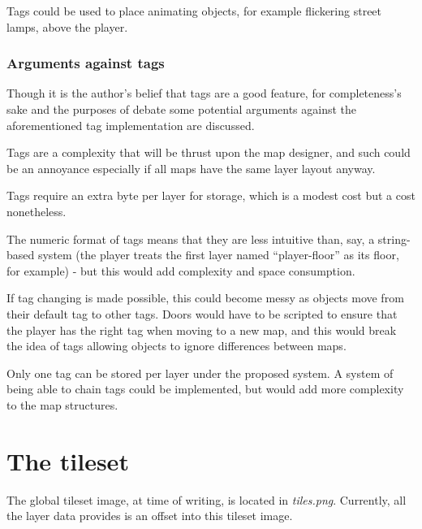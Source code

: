 \documentclass [12pt,a4paper]{article}
\begin{document}
Tags could be used to place animating objects, for example flickering
street lamps, above the player.

\subsubsection{Arguments against tags}

Though it is the author's belief that tags are a good feature, for
completeness's sake and the purposes of debate some potential
arguments against the aforementioned tag implementation are discussed.

Tags are a complexity that will be thrust upon the map designer, and
such could be an annoyance especially if all maps have the same layer
layout anyway.

Tags require an extra byte per layer for storage, which is a modest
cost but a cost nonetheless.

The numeric format of tags means that they are less intuitive than,
say, a string-based system (the player treats the first layer named
``player-floor'' as its floor, for example) - but this would add
complexity and space consumption.

If tag changing is made possible, this could become messy as objects
move from their default tag to other tags.  Doors would have to be
scripted to ensure that the player has the right tag when moving to a
new map, and this would break the idea of tags allowing objects to
ignore differences between maps.

Only one tag can be stored per layer under the proposed system.  A
system of being able to chain tags could be implemented, but would add
more complexity to the map structures.

\section {The tileset}

The global tileset image, at time of writing, is located in
\emph{tiles.png}.  Currently, all the layer data provides is an offset
into this tileset image.
\end{document}
